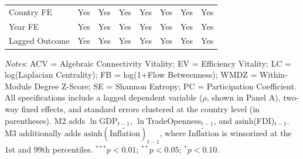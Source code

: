 \begin{table}[!htbp]
\begin{adjustbox}{max width=\textwidth}
\begin{tabular}{lC{1.5cm}C{1.5cm}C{1.5cm}C{1.5cm}C{1.5cm}C{1.5cm}C{1.5cm}}
Country FE & Yes & Yes & Yes & Yes & Yes & Yes & Yes \\
Year FE & Yes & Yes & Yes & Yes & Yes & Yes & Yes \\
Lagged Outcome & Yes & Yes & Yes & Yes & Yes & Yes & Yes \\
\bottomrule
\end{tabular}
\end{adjustbox}
\vspace{4pt}
\begin{minipage}{\textwidth}
\footnotesize
\textit{Notes}: ACV = Algebraic Connectivity Vitality; EV = Efficiency Vitality; LC = log(Laplacian Centrality); FB = log(1+Flow Betweenness); WMDZ = Within-Module Degree Z-Score; SE = Shannon Entropy; PC = Participation Coefficient. All specifications include a lagged dependent variable ($\hat{\rho}$, shown in Panel A), two-way fixed effects, and standard errors clustered at the country level (in parentheses). M2 adds $\ln$GDP$_{t-1}$, $\ln$TradeOpenness$_{t-1}$, and $\text{asinh}$(FDI)$_{t-1}$. M3 additionally adds $\text{asinh}(\widetilde{\text{Inflation}})_{t-1}$, where $\widetilde{\text{Inflation}}$ is winsorized at the 1st and 99th percentiles. $^{***}p<0.01$; $^{**}p<0.05$; $^{*}p<0.10$.
\end{minipage}
\end{table}
